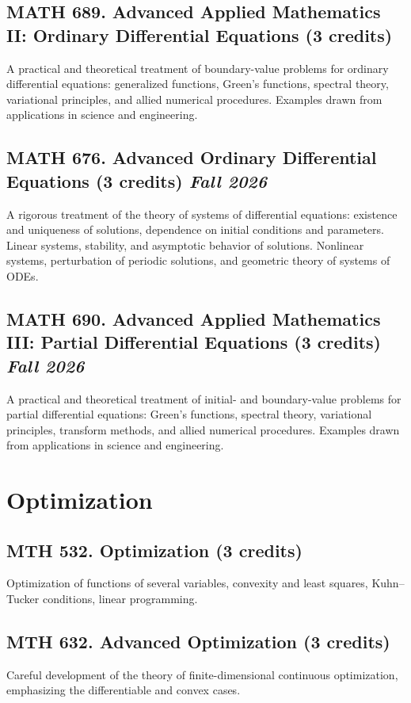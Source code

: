 \documentclass[11pt]{article}
\newcommand{\coursestatus}[1]{\hfill\normalsize\normalfont\textit{#1}}
\begin{document}
\subsection{MATH 689. Advanced Applied Mathematics II: Ordinary Differential Equations \mdseries(3 credits)}
A practical and theoretical treatment of boundary-value problems for ordinary differential equations: generalized functions, Green's functions, spectral theory, variational principles, and allied numerical procedures. Examples drawn from applications in science and engineering.

\subsection{MATH 676. Advanced Ordinary Differential Equations \mdseries(3 credits) \coursestatus{Fall 2026}} 
A rigorous treatment of the theory of systems of differential equations: existence and uniqueness of solutions, dependence on initial conditions and parameters. Linear systems, stability, and asymptotic behavior of solutions. Nonlinear systems, perturbation of periodic solutions, and geometric theory of systems of ODEs.

\subsection{MATH 690. Advanced Applied Mathematics III: Partial Differential Equations \mdseries(3 credits) \coursestatus{Fall 2026}}
A practical and theoretical treatment of initial- and boundary-value problems for partial differential equations: Green's functions, spectral theory, variational principles, transform methods, and allied numerical procedures. Examples drawn from applications in science and engineering.

\section{Optimization}

\subsection{MTH 532. Optimization \mdseries(3 credits)}
Optimization of functions of several variables, convexity and least squares, Kuhn--Tucker conditions, linear programming.

\subsection{MTH 632. Advanced Optimization \mdseries(3 credits)}
Careful development of the theory of finite-dimensional continuous optimization, emphasizing the differentiable and convex cases.
\end{document}
